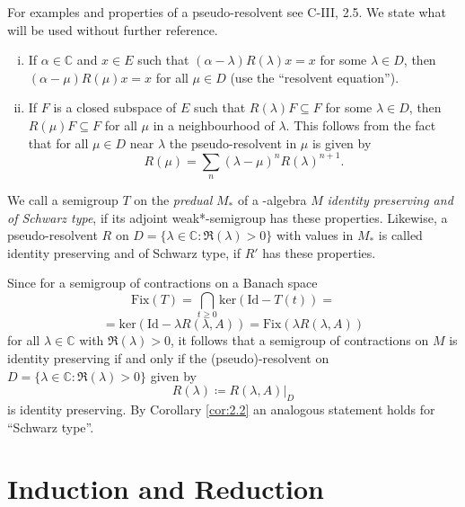 For examples and properties of a pseudo-resolvent see C-III, 2.5.
We state what will be used without further reference.
\begin{enumerate}[(i)]
\item 
If $ \alpha \in \mathbb{C} $ and $ x \in E $ such that $ (\alpha - \lambda)R(\lambda)x = x $ for some $ \lambda \in D $, then $ (\alpha - \mu)R(\mu)x = x $ for all $ \mu \in D $ (use the \enquote{resolvent equation}).

\item 
If $ F $ is a closed subspace of $ E $ such that $ R(\lambda)F \subseteq F $ for some $ \lambda \in D $, then $ R(\mu)F \subseteq F $ for all $ \mu $ in a neighbourhood of $ \lambda $.
This follows from the fact that for all $ \mu \in D $ near $ \lambda $ the pseudo-resolvent in $ \mu $ is given by
\[
R(\mu) = \sum_{n} (\lambda - \mu)^{n} R(\lambda)^{n+1}.
\]
\end{enumerate}
\begin{definition}\label{def:d1-2.4}
We call a semigroup $ T $ on the \emph{predual} $ M_{*} $ of a \WA-algebra $ M $ \emph{identity preserving and of Schwarz type}, if its adjoint weak*-semigroup has these properties.
Likewise, a pseudo-resolvent $ R $ on $ D = \{\lambda \in \mathbb{C} \colon \Re(\lambda) > 0\} $ with values in $ M_{*} $ is called identity preserving and of Schwarz type, if $ R' $ has these properties.
\end{definition}
Since for a semigroup of contractions on a Banach space
\[
\text{Fix}(T) = \bigcap_{t \geq 0} \text{ker}(\text{Id} - T(t)) =
\]
\[
= \text{ker}(\text{Id} - \lambda R(\lambda,A)) = \text{Fix}(\lambda R(\lambda,A))
\]
for all $ \lambda \in \mathbb{C} $ with $ \Re(\lambda) > 0 $, it follows that a semigroup of contractions on $ M $ is identity preserving if and only if the (pseudo)-resolvent on $ D = \{\lambda \in \mathbb{C} \colon \Re(\lambda) > 0\} $ given by
\[
R(\lambda) \coloneqq R(\lambda,A)|_{D}
\]
is identity preserving.
By Corollary \ref{cor:2.2} an analogous statement holds for \enquote{Schwarz type}.

\newpage

\section{Induction and Reduction}

